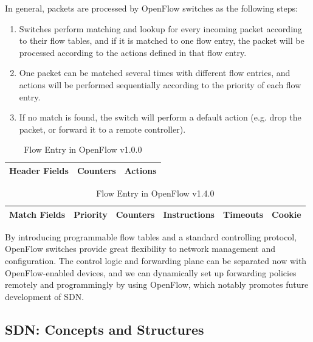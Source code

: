 \documentclass[english]{tktltiki}
\begin{document}
In general, packets are processed by OpenFlow switches as the following steps:

\begin{enumerate}
  \item Switches perform matching and lookup for every incoming packet according to their flow tables, and if it is matched to one flow entry, the packet will be processed according to the actions defined in that flow entry.
  \item One packet can be matched several times with different flow entries, and actions will be performed sequentially according to the priority of each flow entry.
  \item If no match is found, the switch will perform a default action (e.g. drop the packet, or forward it to a remote controller).
\end{enumerate}


\begin{table}
  \centering
  \begin{tabular}{|l|c|r|}
    \hline
    Header Fields & Counters & Actions \\
    \hline
  \end{tabular}
  \caption{Flow Entry in OpenFlow v1.0.0 \cite{openflow-1.0.0}}  
  \label{tab:openflow-1}
\end{table}

\begin{table}
  \centering
  \begin{tabular}{|c|c|c|c|c|c|}
    \hline
    Match Fields & Priority & Counters & Instructions & Timeouts & Cookie \\
    \hline
  \end{tabular}
  \caption{Flow Entry in OpenFlow v1.4.0 \cite{openflow-1.4.0}}  
  \label{tab:openflow-2}
\end{table}

By introducing programmable flow tables and a standard controlling protocol, OpenFlow switches provide great flexibility to network management and configuration. The control logic and forwarding plane can be separated now with OpenFlow-enabled devices, and we can dynamically set up forwarding policies remotely and programmingly by using OpenFlow, which notably promotes future development of SDN.

\subsection{SDN: Concepts and Structures}
\end{document}

